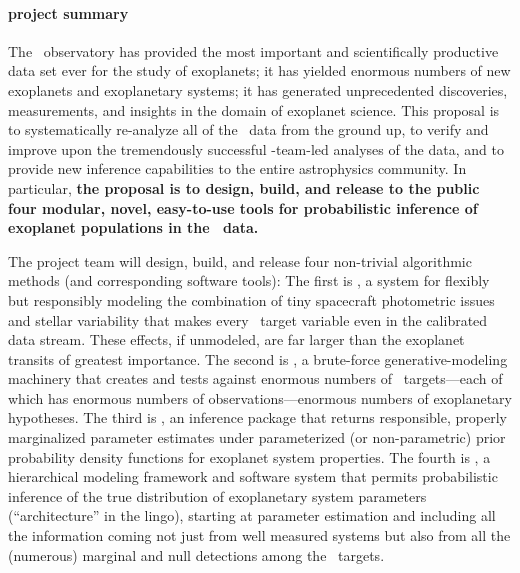 \documentclass[letterpaper,12pt]{article}
\newcommand{\Untrendy}{\package{Untrendy}}
\newcommand{\Turnstyle}{\package{Turnstyle}}
\newcommand{\Bart}{\package{Bart}}
\newcommand{\TheCreator}{\package{The~Creator}}
\begin{document}
\paragraph{project summary}

The \Kepler\ observatory has provided the most important and
scientifically productive data set ever for the study of exoplanets;
it has yielded enormous numbers of new exoplanets and exoplanetary
systems; it has generated unprecedented discoveries, measurements, and
insights in the domain of exoplanet science.  This proposal is to
systematically re-analyze all of the \Kepler\ data from the ground up,
to verify and improve upon the tremendously successful
\Kepler-team-led analyses of the data, and to provide new inference
capabilities to the entire astrophysics community.  In particular,
\textbf{the proposal is to design, build, and release to the public
  four modular, novel, easy-to-use tools for probabilistic inference
  of exoplanet populations in the \Kepler\ data.}

The project team will design, build, and release four non-trivial
algorithmic methods (and corresponding software tools): The first is
\Untrendy, a system for flexibly but responsibly modeling the
combination of tiny spacecraft photometric issues and stellar
variability that makes every \Kepler\ target variable even in the
calibrated data stream.  These effects, if unmodeled, are far larger
than the exoplanet transits of greatest importance.  The second is
\Turnstyle, a brute-force generative-modeling machinery that creates
and tests against enormous numbers of \Kepler\ targets---each of which
has enormous numbers of observations---enormous numbers of
exoplanetary hypotheses.  The third is \Bart, an inference package
that returns responsible, properly marginalized parameter estimates
under parameterized (or non-parametric) prior probability density
functions for exoplanet system properties.  The fourth is \TheCreator,
a hierarchical modeling framework and software system that permits
probabilistic inference of the true distribution of exoplanetary
system parameters (``architecture'' in the lingo), starting at
parameter estimation and including all the information coming not just
from well measured systems but also from all the (numerous) marginal
and null detections among the \Kepler\ targets.
\end{document}
